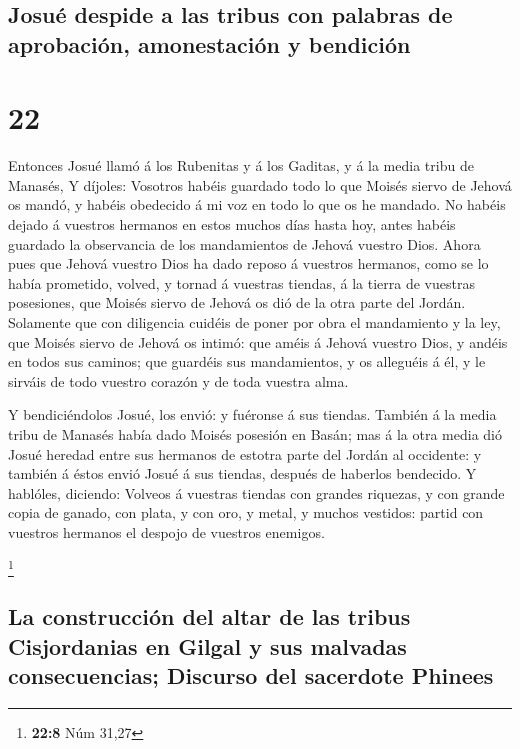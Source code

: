 \hypertarget{josuuxe9-despide-a-las-tribus-con-palabras-de-aprobaciuxf3n-amonestaciuxf3n-y-bendiciuxf3n}{%
\subsection{Josué despide a las tribus con palabras de aprobación,
amonestación y
bendición}\label{josuuxe9-despide-a-las-tribus-con-palabras-de-aprobaciuxf3n-amonestaciuxf3n-y-bendiciuxf3n}}

\hypertarget{section-21}{%
\section{22}\label{section-21}}

 Entonces Josué llamó á los Rubenitas y á los Gaditas, y á
la media tribu de Manasés,  Y díjoles: Vosotros habéis
guardado todo lo que Moisés siervo de Jehová os mandó, y habéis
obedecido á mi voz en todo lo que os he mandado.  No habéis
dejado á vuestros hermanos en estos muchos días hasta hoy, antes habéis
guardado la observancia de los mandamientos de Jehová vuestro Dios.
 Ahora pues que Jehová vuestro Dios ha dado reposo á
vuestros hermanos, como se lo había prometido, volved, y tornad á
vuestras tiendas, á la tierra de vuestras posesiones, que Moisés siervo
de Jehová os dió de la otra parte del Jordán.  Solamente que
con diligencia cuidéis de poner por obra el mandamiento y la ley, que
Moisés siervo de Jehová os intimó: que améis á Jehová vuestro Dios, y
andéis en todos sus caminos; que guardéis sus mandamientos, y os
alleguéis á él, y le sirváis de todo vuestro corazón y de toda vuestra
alma.

 Y bendiciéndolos Josué, los envió: y fuéronse á sus
tiendas.  También á la media tribu de Manasés había dado
Moisés posesión en Basán; mas á la otra media dió Josué heredad entre
sus hermanos de estotra parte del Jordán al occidente: y también á éstos
envió Josué á sus tiendas, después de haberlos bendecido.  Y
hablóles, diciendo: Volveos á vuestras tiendas con grandes riquezas, y
con grande copia de ganado, con plata, y con oro, y metal, y muchos
vestidos: partid con vuestros hermanos el despojo de vuestros enemigos.

\footnote{\textbf{22:8} Núm 31,27}

\hypertarget{la-construcciuxf3n-del-altar-de-las-tribus-cisjordanias-en-gilgal-y-sus-malvadas-consecuencias-discurso-del-sacerdote-phinees}{%
\subsection{La construcción del altar de las tribus Cisjordanias en
Gilgal y sus malvadas consecuencias; Discurso del sacerdote
Phinees}\label{la-construcciuxf3n-del-altar-de-las-tribus-cisjordanias-en-gilgal-y-sus-malvadas-consecuencias-discurso-del-sacerdote-phinees}}


